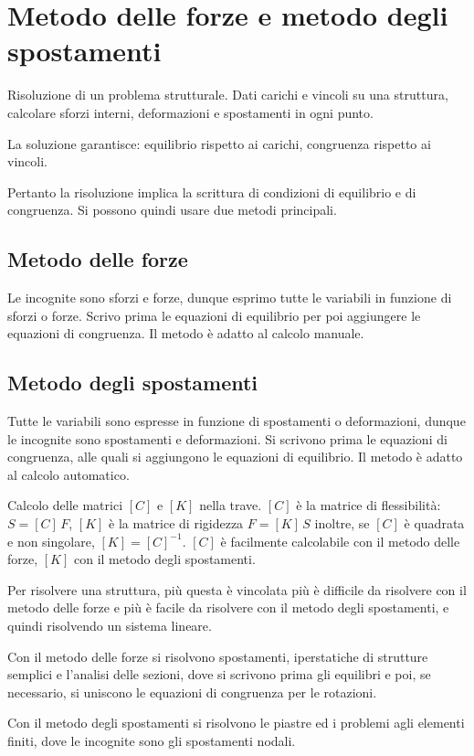 \section{Metodo delle forze e metodo degli spostamenti}

\begin{definizioneBox}
Risoluzione di un problema strutturale. Dati carichi e  vincoli su una struttura, calcolare sforzi interni, deformazioni e spostamenti in ogni punto.
\end{definizioneBox}

La soluzione garantisce: equilibrio rispetto ai carichi, congruenza rispetto ai vincoli.


Pertanto la risoluzione implica la scrittura di condizioni di equilibrio e di congruenza. Si possono quindi usare due metodi principali.

\subsection*{Metodo delle forze}
Le incognite sono sforzi e forze, dunque esprimo tutte le variabili in funzione di sforzi o forze.
Scrivo prima le equazioni di equilibrio per poi aggiungere le equazioni di congruenza. Il metodo è adatto al calcolo manuale.

\subsection*{Metodo degli spostamenti}
Tutte le variabili sono espresse in funzione di spostamenti o deformazioni, dunque le incognite sono spostamenti e deformazioni.
Si scrivono prima le equazioni di congruenza, alle quali si aggiungono le equazioni di equilibrio. Il metodo è adatto al calcolo automatico.

\begin{esempioBox}
Calcolo delle matrici $[C]$ e $[K]$ nella trave. $[C]$ è la matrice di flessibilità: $S = [C] \, F$, $[K]$ è la matrice di rigidezza $F = [K]\,S$ inoltre, se $[C]$ è quadrata e non singolare, $[K] = [C]^{-1}$.
$[C]$ è facilmente calcolabile con il metodo delle forze, $[K]$ con il metodo degli spostamenti.

Per risolvere una struttura, più questa è vincolata più è difficile da risolvere con il metodo delle forze e più è facile da risolvere con il metodo degli spostamenti, e quindi risolvendo un sistema lineare.

Con il metodo delle forze si risolvono spostamenti, iperstatiche di strutture semplici e l'analisi delle sezioni, dove si scrivono prima gli equilibri e poi, se necessario, si uniscono le equazioni di congruenza per le rotazioni.

Con il metodo degli spostamenti si risolvono le piastre ed i problemi agli elementi finiti, dove le incognite sono gli spostamenti nodali.
\end{esempioBox}
